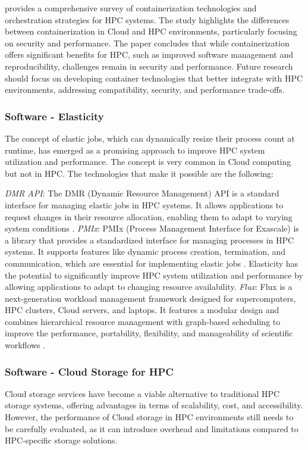     \citeauthor{zhou_containerisation_2023} provides a comprehensive survey of containerization technologies and orchestration strategies for HPC systems. The study highlights the differences between containerization in Cloud and HPC environments, particularly focusing on security and performance. The paper concludes that while containerization offers significant benefits for HPC, such as improved software management and reproducibility, challenges remain in security and performance. Future research should focus on developing container technologies that better integrate with HPC environments, addressing compatibility, security, and performance trade-offs.


    \subsubsection{Software - Elasticity}
    The concept of elastic jobs, which can dynamically resize their process count at runtime, has emerged as a promising approach to improve HPC system utilization and performance. The concept is very common in Cloud computing but not in HPC. The technologies that make it possible are the following:

    \textit{DMR API}: The DMR (Dynamic Resource Management) API is a standard interface for managing elastic jobs in HPC systems. It allows applications to request changes in their resource allocation, enabling them to adapt to varying system conditions \cite{iserte_dmr_2018}.
    \textit{PMIx}: PMIx (Process Management Interface for Exascale) is a library that provides a standardized interface for managing processes in HPC systems. It supports features like dynamic process creation, termination, and communication, which are essential for implementing elastic jobs \cite{castain_pmix_2018, huber_pmix_2022}.
    Elasticity has the potential to significantly improve HPC system utilization and performance by allowing applications to adapt to changing resource availability.
    \textit{Flux}: Flux is a next-generation workload management framework designed for supercomputers, HPC clusters, Cloud servers, and laptops. It features a modular design and combines hierarchical resource management with graph-based scheduling to improve the performance, portability, flexibility, and manageability of scientific workflows \cite{ahn_flux_2020}.


    \subsubsection{Software - Cloud Storage for HPC}
    Cloud storage services have become a viable alternative to traditional HPC storage systems, offering advantages in terms of scalability, cost, and accessibility. However, the performance of Cloud storage in HPC environments still needs to be carefully evaluated, as it can introduce overhead and limitations compared to HPC-specific storage solutions.

